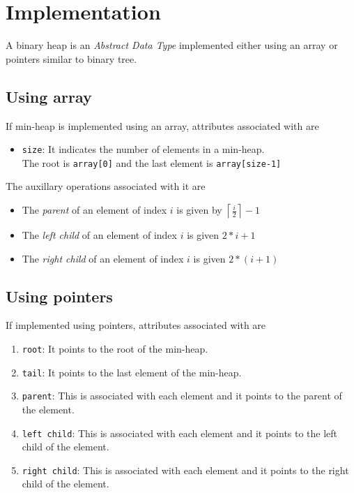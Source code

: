 \documentclass[11pt,a4paper]{amsart}
\theoremstyle{plain}
\numberwithin{equation}{section}
\begin{document}
\section{\textbf{Implementation}}

A binary heap is an \emph{Abstract Data Type} implemented either using an array or pointers similar to binary tree. 
\subsection{Using array}
	If min-heap is implemented using an array, attributes associated with are
	\begin{itemize}
		\item \texttt{size}: It indicates the number of elements in a min-heap.
		\\The root is \texttt{array[0]} and the last element is \texttt{array[size-1]}
	\end{itemize}
	The auxillary operations associated with it are
	\begin{itemize}
		\item The \emph{parent} of an element of index $i$ is given by
		$\displaystyle{\left\lceil{\displaystyle{\frac{i}{2}}}\right\rceil}-1$
		\item The \emph{left child} of an element of index $i$ is given $2*i + 1$
		\item The \emph{right child} of an element of index $i$ is given $2*(i + 1)$
	\end{itemize}
\subsection{Using pointers}
\noindent If implemented using pointers, attributes associated with are
\begin{enumerate}
	\item \texttt{root}: It points to the root of the min-heap.
	\item \texttt{tail}: It points to the last element of the min-heap.
	\item \texttt{parent}: This is associated with each element and it points to the parent of the element.
	\item \texttt{left child}: This is associated with each element and it points to the left child of the element.
	\item \texttt{right child}: This is associated with each element and it points to the right child of the element.
\end{enumerate}
\end{document}
